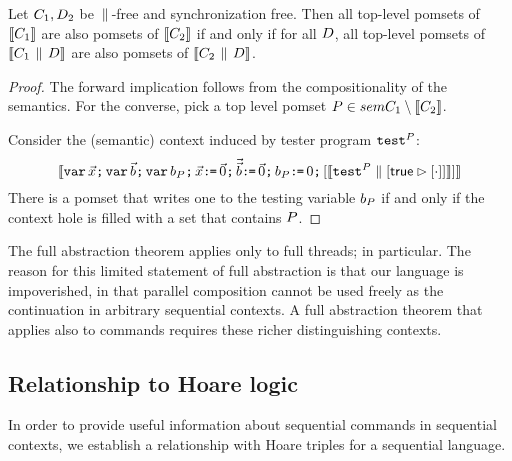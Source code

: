  

\begin{theorem}
Let $C_1, D_2$ be $\,\mathbin{\|}\,$-free and synchronization free.  Then all top-level pomsets of $\llbracket C_1\rrbracket$ are also pomsets of
$\llbracket C_2\rrbracket$ if and only if for all $D$, all top-level pomsets of $\llbracket C_1 \,\mathbin{\|}\, D\rrbracket$ are also pomsets of
$\llbracket C_2 \,\mathbin{\|}\, D\rrbracket$.
\begin{proof}
The forward implication follows from the compositionality of the semantics. For the converse, pick a top level pomset $P \in \\sem{C_1} \setminus \llbracket C_2\rrbracket $. 

Consider the (semantic) context induced by tester program ${\tt test}^{P}_{}$:
\[ \llbracket\texttt{var}\,\vec{x}\texttt{;}\, \texttt{var}\,\vec{b} \texttt{;}\, \texttt{var}\, b_{P} \texttt{;}\,
    \vec{x}\texttt{:}\mkern-1mu\texttt{=}\,\vec{0}\texttt{;}\,
    \vec{\vec{b}}\texttt{:}\mkern-1mu\texttt{=}\,\vec{0} 
    \texttt{;}\, b_{P}\texttt{:}\mkern-1mu\texttt{=}\, 0 \texttt{;}\,  [\llbracket{\tt test}^{P}_{} \parallel [\mathsf{true} \mathbin\rhd [\cdot]]\rrbracket]\rrbracket
\]
There is a pomset that writes one to the  testing variable $b_{P}$ if and only if the context hole is filled with a set that contains $P$.  
\end{proof}
\end{theorem}

The full abstraction theorem applies only to full threads; in particular.  The reason for this limited statement of full abstraction is that our language is impoverished, in that parallel composition cannot be used freely as the continuation in arbitrary sequential contexts.  A full abstraction theorem that applies also to commands requires these richer distinguishing contexts.  


\subsection{Relationship to Hoare logic}
In order to provide useful information about sequential commands in sequential contexts, we establish a relationship with Hoare triples for a sequential language.  

